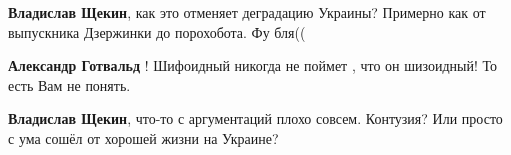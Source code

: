 \begin{itemize}
\begin{itemize}
 
\textbf{Владислав Щекин}, как это отменяет деградацию Украины?
Примерно как от выпускника Дзержинки до порохобота. Фу бля((

 
\textbf{Александр Готвальд} ! Шифоидный никогда не поймет , что он шизоидный! То есть Вам не понять.

 
\textbf{Владислав Щекин}, что-то с аргументаций плохо совсем. Контузия? Или просто с ума сошёл от хорошей жизни на Украине?

\end{itemize}

\end{itemize}

